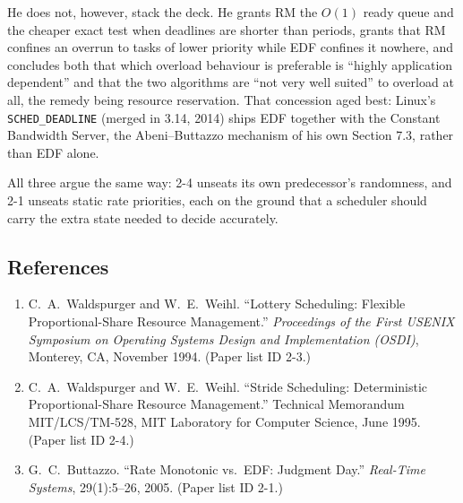 He does not, however, stack the deck. He grants RM the $O(1)$ ready queue and the cheaper exact
test when deadlines are shorter than periods, grants that RM confines an overrun to tasks of
lower priority while EDF confines it nowhere, and concludes both that which overload behaviour is
preferable is ``highly application dependent'' and that the two algorithms are ``not very well
suited'' to overload at all, the remedy being resource reservation. That concession aged best:
Linux's
\texttt{SCHED\_DEADLINE} (merged in 3.14, 2014) ships EDF together with the Constant Bandwidth
Server, the Abeni--Buttazzo mechanism of his own Section 7.3, rather than EDF alone.

\medskip
All three argue the same way: 2-4 unseats its own predecessor's randomness, and 2-1 unseats
static rate priorities, each on the ground that a scheduler should carry the extra state needed
to decide accurately.

\subsection*{References}

\begin{enumerate}
  \item[{[1]}] C.~A.~Waldspurger and W.~E.~Weihl. ``Lottery Scheduling: Flexible
    Proportional-Share Resource Management.'' \emph{Proceedings of the First USENIX Symposium on
    Operating Systems Design and Implementation (OSDI)}, Monterey, CA, November 1994.
    (Paper list ID 2-3.)
  \item[{[2]}] C.~A.~Waldspurger and W.~E.~Weihl. ``Stride Scheduling: Deterministic
    Proportional-Share Resource Management.'' Technical Memorandum MIT/LCS/TM-528, MIT Laboratory
    for Computer Science, June 1995. (Paper list ID 2-4.)
  \item[{[3]}] G.~C.~Buttazzo. ``Rate Monotonic vs.\ EDF: Judgment Day.'' \emph{Real-Time
    Systems}, 29(1):5--26, 2005. (Paper list ID 2-1.)
\end{enumerate}
